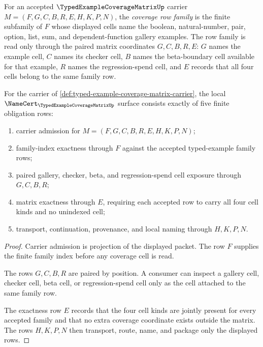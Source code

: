 \begin{definition}
\label{def:typed-example-coverage-matrix-row-family}
For an accepted $\TypedExampleCoverageMatrixUp$ carrier $M=(F,G,C,B,R,E,H,K,P,N)$, the \emph{coverage row family} is the finite subfamily of $F$ whose displayed cells name the boolean, natural-number, pair, option, list, sum, and dependent-function gallery examples. The row family is read only through the paired matrix coordinates $G,C,B,R,E$: $G$ names the example cell, $C$ names its checker cell, $B$ names the beta-boundary cell available for that example, $R$ names the regression-spend cell, and $E$ records that all four cells belong to the same family row.
\end{definition}

\begin{theorem}
\label{thm:typed-example-coverage-matrix-namecert-obligations}
For the carrier of \autoref{def:typed-example-coverage-matrix-carrier}, the local $\NameCert_{\TypedExampleCoverageMatrixUp}$ surface consists exactly of five finite obligation rows:
\begin{enumerate}
\item carrier admission for $M=(F,G,C,B,R,E,H,K,P,N)$;
\item family-index exactness through $F$ against the accepted typed-example family rows;
\item paired gallery, checker, beta, and regression-spend cell exposure through $G,C,B,R$;
\item matrix exactness through $E$, requiring each accepted row to carry all four cell kinds and no unindexed cell;
\item transport, continuation, provenance, and local naming through $H,K,P,N$.
\end{enumerate}
\end{theorem}
\begin{proof}
Carrier admission is projection of the displayed packet. The row $F$ supplies the finite family index before any coverage cell is read.

The rows $G,C,B,R$ are paired by position. A consumer can inspect a gallery cell, checker cell, beta cell, or regression-spend cell only as the cell attached to the same family row.

The exactness row $E$ records that the four cell kinds are jointly present for every accepted family and that no extra coverage coordinate exists outside the matrix. The rows $H,K,P,N$ then transport, route, name, and package only the displayed rows.
\end{proof}

